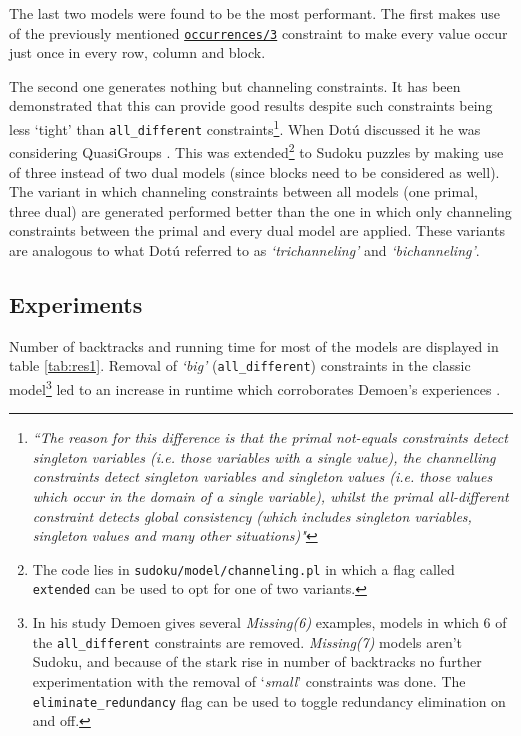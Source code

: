 The last two models were found to be the most performant. The first makes use of the previously mentioned \href{http://eclipseclp.org/doc/bips/lib/ic_global/occurrences-3.html}{\texttt{occurrences/3}} constraint to make every value occur just once in every row, column and block. 
\par The second one generates nothing but channeling constraints. It has been demonstrated that this can provide good results despite such constraints being less `tight' than \texttt{all\_different} constraints\footnote{\textit{``The reason for this difference is that the primal not-equals constraints detect singleton variables (i.e. those variables with a single value), the channelling constraints detect singleton variables and singleton values (i.e. those values which occur in the domain of a single variable), whilst the primal all-different constraint detects global consistency (which includes singleton variables, singleton values and many other situations)"}\cite{article:channeling}}. When Dot\'u discussed it he was considering QuasiGroups \cite{article:quasi}. This was extended\footnote{The code lies in \texttt{sudoku/model/channeling.pl} in which a flag called \texttt{extended} can be used to opt for one of two variants.} to Sudoku puzzles by making use of three instead of two dual models (since blocks need to be considered as well). The variant in which channeling constraints between all models (one primal, three dual) are generated performed better than the one in which only channeling constraints between the primal and every dual model are applied. These variants are analogous to what Dot\'u referred to as \textit{`trichanneling'} and \textit{`bichanneling'}.

\subsection{Experiments}

Number of backtracks and running time for most of the models are displayed in table \ref{tab:res1}. Removal of \textit{`big'} (\texttt{all\_different}) constraints in the classic model\footnote{In his study Demoen gives several \textit{Missing(6)} examples, models in which 6 of the \texttt{all\_different} constraints are removed. \textit{Missing(7)} models aren't Sudoku, and because of the stark rise in number of backtracks no further experimentation with the removal of `\textit{small}' constraints was done. The \texttt{eliminate\_redundancy} flag can be used to toggle redundancy elimination on and off.} led to an increase in runtime which corroborates Demoen's experiences \cite{article:demoen}.  \\\par

